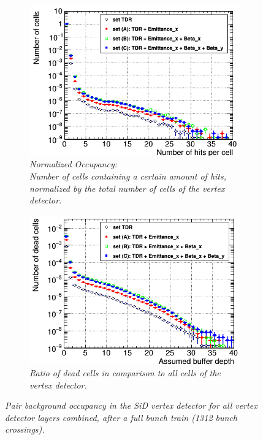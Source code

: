 \begin{figure}[h]
\centering
\begin{subfigure}[t]{0.45\textwidth}
\centering
\includegraphics[width=1.06\textwidth]{figures/Occupancy_Comparison_All_layers_wrt_cells_ILC250_Comparison_ALL_SETS_5T_w_antiDiD_LEG.png}
\caption{\textit{Normalized Occupancy:\\Number of cells containing a certain amount of hits, normalized by the total number of cells of the vertex detector.}}
\end{subfigure}
\hspace*{0.3cm}
\begin{subfigure}[t]{0.45\textwidth}
\centering
\includegraphics[width=1.05\textwidth]{figures/Occupancy_Comparison_All_layers_deadcells_ILC250_Comparison_ALL_SETS_5T_w_antiDiD_LEG.png}
\caption{\textit{Ratio of dead cells in comparison to all cells of the vertex detector.}}
\end{subfigure}
\caption{\textit{Pair background occupancy in the SiD vertex detector for all vertex detector layers combined, after a full bunch train (1312 bunch crossings).}}
\label{fig:All_layers_Occupancy}
\end{figure}
